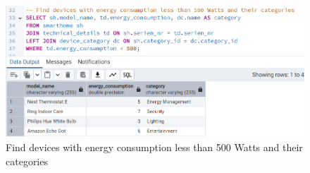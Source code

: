 \documentclass{article}
\begin{document}
\begin{figure}[H]
\centering
\includegraphics[width=\linewidth]{img/q6.png}
\caption{Find devices with energy consumption less than 500 Watts and their categories}
\end{figure}
\end{document}
